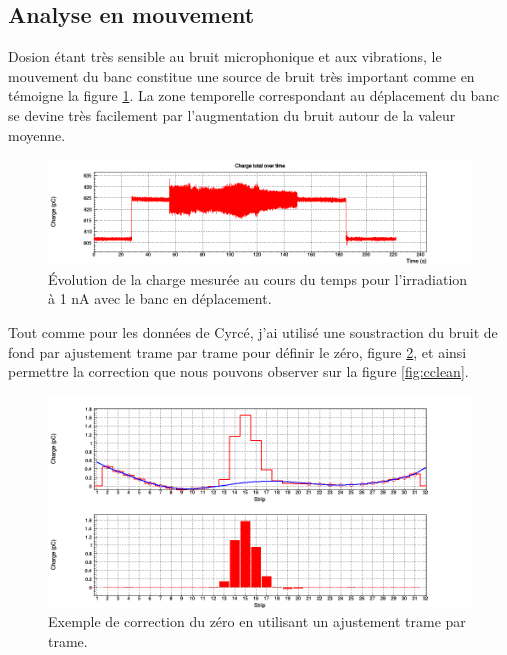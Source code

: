 \documentclass[a4paper,11pt]{article}
\begin{document}
\subsection*{Analyse en mouvement}
Dosion étant très sensible au bruit microphonique et aux vibrations, le mouvement du banc constitue une source de bruit très important comme en témoigne la figure \ref{fig:charge}.
La zone temporelle correspondant au déplacement du banc se devine très facilement par l'augmentation du bruit autour de la valeur moyenne.
\begin{figure}[h]
\begin{center}
\includegraphics[width=1.\linewidth]{Charge.png} 
\caption{\label{fig:charge}\footnotesize{\'Evolution de la charge mesurée au cours du temps pour l'irradiation à 1 nA avec le banc en déplacement.}}
\end{center}
\end{figure}
Tout comme pour les données de Cyrcé, j'ai utilisé une soustraction du bruit de fond par ajustement trame par trame pour définir le zéro, figure \ref{fig:zero}, et ainsi permettre la correction que nous pouvons observer sur la figure \ref{fig:cclean}.
\begin{figure}[h]
\begin{center}
\includegraphics[width=1.\linewidth]{SFB_143.png} 
\caption{\label{fig:zero}\footnotesize{Exemple de correction du zéro en utilisant un ajustement trame par trame.}}
\end{center}
\end{figure}
\end{document}
